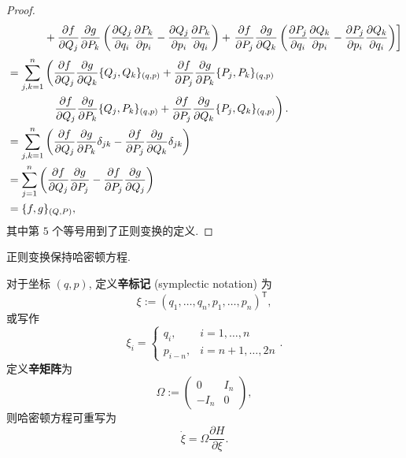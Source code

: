 \begin{proof}
\begin{align*}
        &\hspace{33.9pt}+\frac{\partial f}{\partial Q_j}\frac{\partial g}{\partial P_k}\left( \frac{\partial Q_j}{\partial q_i}\frac{\partial P_k}{\partial p_i}-\frac{\partial Q_j}{\partial p_i}\frac{\partial P_k}{\partial q_i} \right)+\left. \frac{\partial f}{\partial P_j}\frac{\partial g}{\partial Q_k}\left( \frac{\partial P_j}{\partial q_i}\frac{\partial Q_k}{\partial p_i}-\frac{\partial P_j}{\partial p_i}\frac{\partial Q_k}{\partial q_i} \right) \right]\\[2pt]
        &=\sum_{j,k=1}^{n}\left( \frac{\partial f}{\partial Q_j}\frac{\partial g}{\partial Q_k}\{Q_j,Q_k\}_{(q,p)}+\frac{\partial f}{\partial P_j}\frac{\partial g}{\partial P_k}\{P_j,P_k\}_{(q,p)} \right.\\ 
        &\hspace{40.8pt}\left.\frac{\partial f}{\partial Q_j}\frac{\partial g}{\partial P_k}\{Q_j,P_k\}_{(q,p)}+\frac{\partial f}{\partial P_j}\frac{\partial g}{\partial Q_k}\{P_j,Q_k\}_{(q,p)}\right).\\
        &= \sum_{j,k=1}^{n}\left( \frac{\partial f}{\partial Q_j}\frac{\partial g}{\partial P_k}\delta_{jk}-\frac{\partial f}{\partial P_j}\frac{\partial g}{\partial Q_k}\delta_{jk} \right)\\ 
        &= \sum_{j=1}^{n}\left( \frac{\partial f}{\partial Q_j}\frac{\partial g}{\partial P_j}-\frac{\partial f}{\partial P_j}\frac{\partial g}{\partial Q_j} \right)\\ 
        &= \{f,g\}_{(Q,P)},
    \end{align*}
    其中第 $5$ 个等号用到了正则变换的定义.
\end{proof}

\begin{theorem}
    正则变换保持哈密顿方程.
\end{theorem}

对于坐标 $ (q,p) $, 定义{\bf 辛标记} (symplectic notation) 为 
\[ \xi:=(q_1,\dots,q_n,p_1,\dots,p_n)^{\mathsf{T}},\] 
或写作
\[ \xi_i=\begin{cases}
    q_i, & i=1,\dots,n\\ 
    p_{i-n}, & i=n+1,\dots,2n
\end{cases}. \]
定义{\bf 辛矩阵}为
\[ \Omega:=\left( \begin{matrix}
    0 & I_n\\ 
    -I_n & 0
\end{matrix} \right), \]
则哈密顿方程可重写为
\[ \dot{\xi}=\Omega\frac{\partial H}{\partial\xi}. \]

